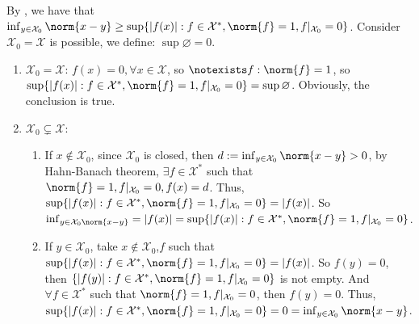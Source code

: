 \documentclass{ctexart}
\begin{document}
\begin{solution}
 By , we have that \(\inf_{y \in \mathcal{X}_0}\norm{x-y} \geq \sup\{|f(x)|:f \in \mathcal{X}^*, \norm{f}=1, f|_{\mathcal{X}_0}=0\} \).
 Consider \(\mathcal{X}_0=\mathcal{X}\) is possible, we define: \(\sup \varnothing =0\).
 \begin{enumerate}
   \item \(\mathcal{X}_0=\mathcal{X}\): \(f(x)=0, \forall x \in \mathcal{X}\), so \(\notexists f: \norm{f}=1\), so \(\sup \{|f(x)|: f \in \mathcal{X}^*, \norm{f}=1, f|_{\mathcal{X}_0}=0\}= \sup \varnothing\).
     Obviously, the conclusion is true.
   \item \(\mathcal{X}_0 \subsetneq \mathcal{X}\):\begin{enumerate}
     \item If \(x \notin \mathcal{X}_0\), since \(\mathcal{X}_0\) is closed, then
       \(d:=\inf_{y \in \mathcal{X}_0}\norm{x-y} > 0\), by Hahn-Banach theorem, \(\exists f \in \mathcal{X}^*\) such that
       \(\norm{f}=1, f|_{\mathcal{X}_0}=0, f(x)=d\). Thus, \( \sup\{|f(x)|:f \in \mathcal{X}^*, \norm{f}=1, f|_{\mathcal{X}_0}=0\}=|f(x)| \).
       So \(\inf_{y \in \mathcal{X}_0 \norm{x-y}}= |f(x)|= \sup\{|f(x)|:f \in \mathcal{X}^*, \norm{f}=1, f|_{\mathcal{X}_0}=0\} \).
     \item If \(y \in \mathcal{X}_0\), take \(x \notin \mathcal{X}_0\),\(f\) such that \( \sup\{|f(x)|:f \in \mathcal{X}^*, \norm{f}=1, f|_{\mathcal{X}_0}=0\}=|f(x)| \).
       So \(f(y)=0\), then  \(\{|f(y)|: f \in \mathcal{X}^*, \norm{f}=1, f|_{\mathcal{X}_0}=0\}\) is not empty.
       And \(\forall f \in \mathcal{X}^* \) such that \(\norm{f}=1, f|_{\mathcal{X}_0}=0\), then \(f(y)=0\). 
       Thus,  \( \sup\{|f(x)|:f \in \mathcal{X}^*, \norm{f}=1, f|_{\mathcal{X}_0}=0\}=0=\inf_{y \in \mathcal{X}_0}\norm{x-y} \).


   \end{enumerate}

 \end{enumerate}
\end{solution}
\end{document}
